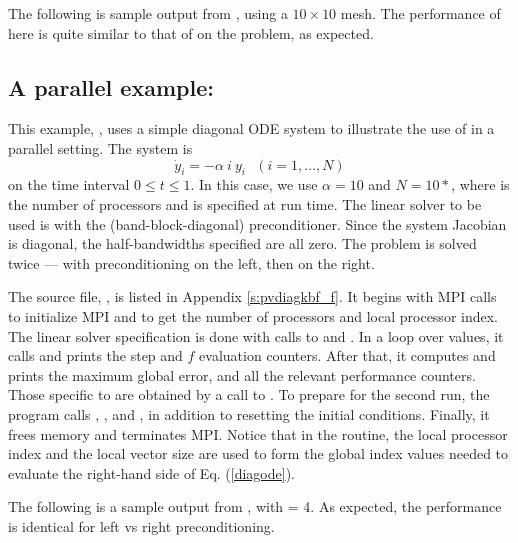 The following is sample output from , using a $10 \times 10$ mesh.
The performance of {\fcvode} here is quite similar to that of {\cvode} on
the  problem, as expected.



\subsection{A parallel example: }\label{ss:pvdiagkbf}

This example, , uses a simple diagonal ODE system to illustrate
the use of {\fcvode} in a parallel setting.  The system is
\begin{equation} \label{diagode}
\dot{y}_i = - \alpha ~i~ y_i ~~~ (i = 1,\ldots, N)
\end{equation}
on the time interval $0 \leq t \leq 1$.  In this case, we use $\alpha = 10$
and $N = 10*$, where  is the number of processors
and is specified at run time.  The linear solver to be used is
{\spgmr} with the {\cvbbdpre} (band-block-diagonal) preconditioner.
Since the system Jacobian is diagonal, the half-bandwidths specified
are all zero.  The problem is solved twice --- with preconditioning on
the left, then on the right.

The source file, , is listed in Appendix \ref{s:pvdiagkbf_f}.
It begins with MPI calls to initialize MPI and to get the number of processors
and local processor index.  The linear solver specification is done with
calls to  and .  In a loop over 
values, it calls  and prints the step and $f$ evaluation counters.
After that, it computes and prints the maximum global error, and all the
relevant performance counters.  Those specific to {\cvbbdpre} are obtained
by a call to .  To prepare for the second run, the program
calls , , and , in addition
to resetting the initial conditions.  Finally, it frees memory and terminates MPI.
Notice that in the  routine, the local processor index 
and the local vector size  are used to form the global index
values needed to evaluate the right-hand side of Eq. (\ref{diagode}).

The following is a sample output from , with  = 4.
As expected, the performance is identical for left vs right preconditioning.


